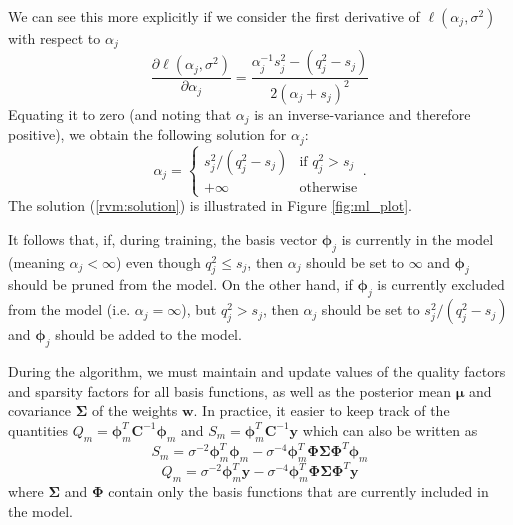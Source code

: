 We can see this more explicitly if we consider the first derivative of $\ell(\alpha_j,\sigma^2)$ with respect to $\alpha_j$ \cite{tipping2002}
\begin{equation*}
  \frac{\partial\ell(\alpha_j,\sigma^2)}{\partial\alpha_j} = \frac{\alpha_j^{-1}s_j^2 - (q_j^2 - s_j)}{2(\alpha_j+s_j)^2}
\end{equation*}
Equating it to zero (and noting that $\alpha_j$ is an inverse-variance and therefore positive), we obtain the following solution for $\alpha_j$:
\begin{equation}
  \label{rvm:solution}
  \alpha_j = \left\{\begin{array}{lr}
      s_j^2 / (q_j^2 - s_j) & \mbox{if $q_j^2 > s_j$}\\
      +\infty & \mbox{otherwise}
    \end{array}\right..
\end{equation}
The solution (\ref{rvm:solution}) is illustrated in Figure \ref{fig:ml_plot}.

It follows that, if, during training, the basis vector $\bm\phi_j$ is currently in the model (meaning $\alpha_j < \infty$) even though $q_j^2 \leq s_j$, then $\alpha_j$ should be set to $\infty$ and $\bm\phi_j$ should be pruned from the model.
On the other hand, if $\bm\phi_j$ is currently excluded from the model (i.e. $\alpha_j=\infty$), but $q_j^2 > s_j$, then $\alpha_j$ should be set to $s_j^2/(q_j^2-s_j)$ and $\bm\phi_j$ should be added to the model.

During the algorithm, we must maintain and update values of the quality factors and sparsity factors for all basis functions, as well as the posterior mean $\bm\mu$ and covariance $\bm\Sigma$ of the weights $\bm w$.
In practice, it easier to keep track of the quantities $Q_m = \bm\phi_m^T\bm C^{-1}\bm\phi_m$ and $S_m = \bm\phi_m^T\bm C^{-1}\bm y$ which can also be written as
\begin{equation}
  \label{rvm:S}
  S_m = \sigma^{-2}\bm\phi_m^T\bm\phi_m - \sigma^{-4}\bm\phi_m^T\bm\Phi\bm\Sigma\bm\Phi^T\bm\phi_m
\end{equation}
\begin{equation}
  \label{rvm:Q}
  Q_m = \sigma^{-2}\bm\phi_m^T\bm y - \sigma^{-4}\bm\phi_m^T\bm\Phi\bm\Sigma\bm\Phi^T\bm y
\end{equation}
where $\bm\Sigma$ and $\bm\Phi$ contain only the basis functions that are currently included in the model.

